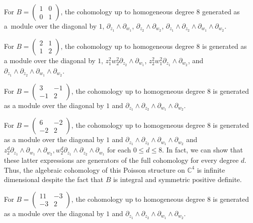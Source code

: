 \documentclass[pdftex]{sigma}
\numberwithin{equation}{section}
\begin{document}
\begin{Example}
For $B=\begin{pmatrix}1 & 0 \\ 0 & 1\end{pmatrix}$, the cohomology up to homogeneous degree $8$ generated as a~module over the diagonal by $1$, $\partial_{z_1}\wedge\partial_{w_1}$, $\partial_{z_2}\wedge\partial_{w_2}$, $\partial_{z_1}\wedge\partial_{z_2}\wedge\partial_{w_1}\wedge\partial_{w_2}$.
\end{Example}
\begin{Example}
For $B=\begin{pmatrix}2 & 1 \\ 1 & 2\end{pmatrix}$, the cohomology up to homogeneous degree $8$ is generated as a module over the diagonal by $1$, $z_1^2w_2^2\partial_{z_2}\wedge\partial_{w_1}$, $z_2^2w_1^2\partial_{z_1}\wedge\partial_{w_2}$, and $\partial_{z_1}\wedge\partial_{z_2}\wedge\partial_{w_1}\wedge\partial_{w_2}$.
\end{Example}
\begin{Example}
For $B=\begin{pmatrix}3 & -1 \\ -1 & 2\end{pmatrix}$, the cohomology up to homogeneous degree $8$ is generated as a module over the diagonal by $1$ and $\partial_{z_1}\wedge\partial_{z_2}\wedge\partial_{w_1}\wedge\partial_{w_2}$.
\end{Example}
\begin{Example}
For $B=\begin{pmatrix}6 & -2 \\ -2 & 2\end{pmatrix}$, the cohomology up to homogeneous degree $8$ is generated as a module over the diagonal by $1$ and $\partial_{z_1}\wedge\partial_{z_2}\wedge\partial_{w_1}\wedge\partial_{w_2}$ and $z_2^d\partial_{z_1}\wedge\partial_{w_1}\wedge\partial_{w_2},w_2^d\partial_{z_1}\wedge\partial_{z_2}\wedge\partial_{w_1}$ for each $0\le d\le 8$. In fact, we can show that these latter expressions are generators of the full cohomology for every degree $d$. Thus, the algebraic cohomology of this Poisson structure on ${\mathbb C}^4$ is inf\/inite dimensional despite the fact that $B$ is integral and symmetric positive def\/inite.
\end{Example}
\begin{Example}
For $B=\begin{pmatrix}11 & -3 \\ -3 & 2\end{pmatrix}$, the cohomology up to homogeneous degree $8$ is generated as a module over the diagonal by $1$ and $\partial_{z_1}\wedge\partial_{z_2}\wedge\partial_{w_1}\wedge\partial_{w_2}$.
\end{Example}
\end{document}
